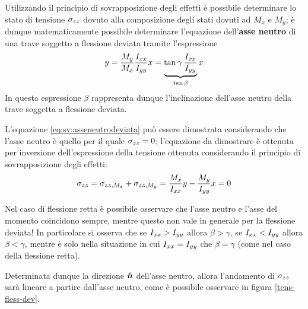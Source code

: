 		\begin{concetto}
			Utilizzando il principio di sovrapposizione degli effetti è possibile determinare lo stato di tensione $\sigma_{zz}$ dovuto alla composizione degli stati dovuti ad $M_x$ e $M_y$; è dunque matematicamente possibile determinare l'equazione dell'\textbf{asse neutro} di una trave soggetto a flessione deviata tramite l'espressione
			\begin{equation} \label{eq:sv:asseneutrodeviata}
				y = \frac {M_y} {M_x} \frac {I_{xx}} {I_{yy}} x = \underbrace{\tan\gamma\, \frac {I_{xx}} {I_{yy}}}_{\tan\beta} x
			\end{equation}
			In questa espressione $\beta$ rappresenta dunque l'inclinazione dell'asse neutro della trave soggetta a flessione deviata.
		\end{concetto}
		\begin{dimostrazione}
			L'equazione \ref{eq:sv:asseneutrodeviata} può essere dimostrata considerando che l'asse neutro è quello per il quale $\sigma_{zz} = 0$; l'equazione da dimostrare è ottenuta per inversione dell'espressione della tensione ottenuta considerando il principio di sovrapposizione degli effetti:
			\[ \sigma_{zz} = \sigma_{zz,M_x} + \sigma_{zz, M_y} = \frac {M_x} {I_{xx}} y - \frac {M_y} {I_{yy}} x = 0\]
		\end{dimostrazione}
		\begin{osservazione}
			Nel caso di flessione retta è possibile osservare che l'asse neutro e l'asse del momento coincidono sempre, mentre questo non vale in generale per la flessione deviata! In particolare si osserva che se $I_{xx} > I_{yy}$ allora $\beta > \gamma$, se $I_{xx} < I_{yy}$ allora $\beta < \gamma$, mentre è solo nella situazione in cui $I_{xx} = I_{yy}$ che $\beta = \gamma$  (come nel caso della flessione retta).
		\end{osservazione}
	
		Determinata dunque la direzione $\boldsymbol{\hat{n}}$ dell'asse neutro, allora l'andamento di $\sigma_{zz}$ sarà lineare a partire dall'asse neutro, come è possibile osservare in figura \ref{tens-fless-dev}.
	
		
